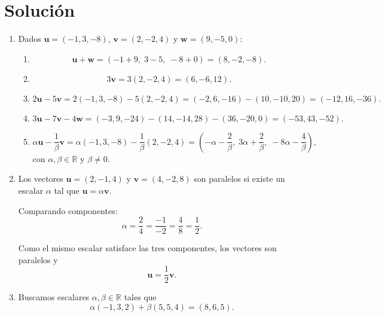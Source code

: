 \documentclass[12pt,letterpaper]{article}
\begin{document}
\newpage

\section*{Solución}

\begin{enumerate}
    \item Dados $\mathbf{u} = (-1,3,-8)$, $\mathbf{v} = (2,-2,4)$ y $\mathbf{w} = (9,-5,0)$:

    \begin{enumerate}
        \item 
        \[
        \mathbf{u} + \mathbf{w} = (-1+9,\; 3-5,\; -8+0) = (8,-2,-8).
        \]

        \item 
        \[
        3\mathbf{v} = 3(2,-2,4) = (6,-6,12).
        \]

        \item 
        \[
        2\mathbf{u} - 5\mathbf{v}
        = 2(-1,3,-8) - 5(2,-2,4)
        = (-2,6,-16) - (10,-10,20)
        = (-12,16,-36).
        \]
        
        \item 
        \[
        3\mathbf{u} - 7\mathbf{v} - 4\mathbf{w}
        = (-3,9,-24) - (14,-14,28) - (36,-20,0)
        = (-53,43,-52).
        \]

        \item 
        \[
        \alpha \mathbf{u} - \frac{1}{\beta}\mathbf{v}
        = \alpha(-1,3,-8) - \frac{1}{\beta}(2,-2,4)
        = \left(-\alpha-\frac{2}{\beta},\; 3\alpha+\frac{2}{\beta},\; -8\alpha-\frac{4}{\beta}\right),
        \]
        con $\alpha,\beta \in \mathbb{R}$ y $\beta \neq 0$.
    \end{enumerate}

    \item Los vectores $\mathbf{u}=(2,-1,4)$ y $\mathbf{v}=(4,-2,8)$ son paralelos si existe un escalar $\alpha$ tal que $\mathbf{u}=\alpha\mathbf{v}$.

    Comparando componentes:
    \[
    \alpha = \frac{2}{4} = \frac{-1}{-2} = \frac{4}{8} = \frac{1}{2}.
    \]

    Como el mismo escalar satisface las tres componentes, los vectores son paralelos y
    \[
    \mathbf{u}=\frac{1}{2}\mathbf{v}.
    \]

    \item Buscamos escalares $\alpha,\beta \in \mathbb{R}$ tales que
    \[
    \alpha(-1,3,2) + \beta(5,5,4) = (8,6,5).
    \]


\end{enumerate}
\end{document}

